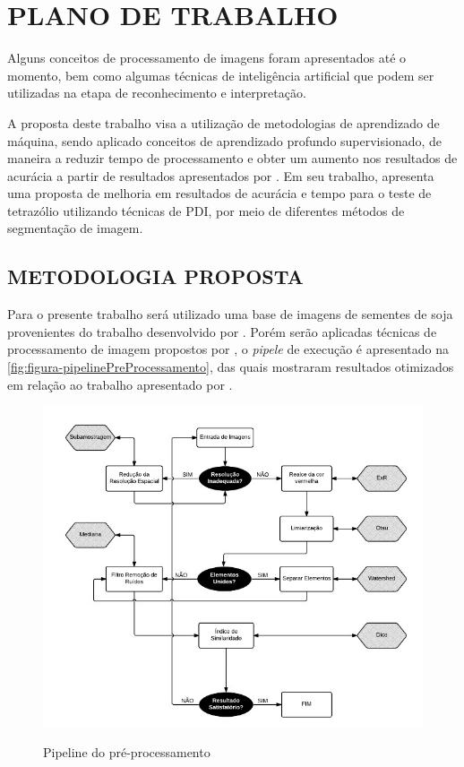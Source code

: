 
\chapter{PLANO DE TRABALHO}
\label{chap:metodologia}
Alguns conceitos de processamento de imagens foram apresentados até o momento, bem como algumas técnicas de inteligência artificial que podem ser utilizadas na etapa de reconhecimento e interpretação. 

A proposta deste trabalho visa a utilização de metodologias de aprendizado de máquina, sendo aplicado conceitos de aprendizado profundo supervisionado, de maneira a reduzir tempo de processamento e obter um aumento nos resultados de acurácia a partir de resultados apresentados por . Em seu trabalho,  apresenta uma proposta de melhoria em resultados de acurácia e tempo para o teste de tetrazólio utilizando técnicas de PDI, por meio de diferentes métodos de segmentação de imagem.

\section{METODOLOGIA PROPOSTA}
\label{sec:titSecMetProposta}

Para o presente trabalho será utilizado uma base de imagens de sementes de soja provenientes do trabalho desenvolvido por . Porém serão aplicadas técnicas de processamento de imagem propostos por , o \textit{pipele} de execução é apresentado na \autoref{fig:figura-pipelinePreProcessamento}, das quais mostraram resultados otimizados em relação ao trabalho apresentado por .

\begin{figure}[!htb]
    \centering
    \caption{Pipeline do pré-processamento}
    \includegraphics[width=1\textwidth]{./dados/figuras/pipeline-paglione.jpeg}
    \fonte{}
    \label{fig:figura-pipelinePreProcessamento}
\end{figure}

